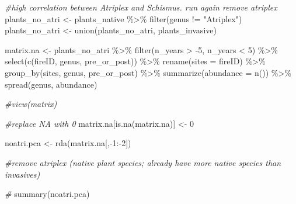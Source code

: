 \documentclass[
]{article}
\newenvironment{Shaded}{\begin{snugshade}}{\end{snugshade}}
\newcommand{\AttributeTok}[1]{\textcolor[rgb]{0.77,0.63,0.00}{#1}}
\newcommand{\CommentTok}[1]{\textcolor[rgb]{0.56,0.35,0.01}{\textit{#1}}}
\newcommand{\DecValTok}[1]{\textcolor[rgb]{0.00,0.00,0.81}{#1}}
\newcommand{\FunctionTok}[1]{\textcolor[rgb]{0.00,0.00,0.00}{#1}}
\newcommand{\NormalTok}[1]{#1}
\newcommand{\OtherTok}[1]{\textcolor[rgb]{0.56,0.35,0.01}{#1}}
\newcommand{\SpecialCharTok}[1]{\textcolor[rgb]{0.00,0.00,0.00}{#1}}
\newcommand{\StringTok}[1]{\textcolor[rgb]{0.31,0.60,0.02}{#1}}
\begin{document}
\begin{Shaded}
\begin{Highlighting}[]
\CommentTok{\#high correlation between Atriplex and Schismus. run again remove atriplex}
\NormalTok{plants\_no\_atri }\OtherTok{\textless{}{-}}\NormalTok{ plants\_native }\SpecialCharTok{\%\textgreater{}\%} 
  \FunctionTok{filter}\NormalTok{(genus }\SpecialCharTok{!=} \StringTok{"Atriplex"}\NormalTok{)}
\NormalTok{plants\_no\_atri }\OtherTok{\textless{}{-}} \FunctionTok{union}\NormalTok{(plants\_no\_atri, plants\_invasive)}

\NormalTok{matrix.na }\OtherTok{\textless{}{-}}\NormalTok{ plants\_no\_atri }\SpecialCharTok{\%\textgreater{}\%}
  \FunctionTok{filter}\NormalTok{(n\_years }\SpecialCharTok{\textgreater{}} \SpecialCharTok{{-}}\DecValTok{5}\NormalTok{, n\_years }\SpecialCharTok{\textless{}} \DecValTok{5}\NormalTok{) }\SpecialCharTok{\%\textgreater{}\%}
  \FunctionTok{select}\NormalTok{(}\FunctionTok{c}\NormalTok{(fireID, genus, pre\_or\_post)) }\SpecialCharTok{\%\textgreater{}\%} 
  \FunctionTok{rename}\NormalTok{(}\AttributeTok{sites =}\NormalTok{ fireID) }\SpecialCharTok{\%\textgreater{}\%}  
  \FunctionTok{group\_by}\NormalTok{(sites, genus, pre\_or\_post) }\SpecialCharTok{\%\textgreater{}\%} 
  \FunctionTok{summarize}\NormalTok{(}\AttributeTok{abundance =} \FunctionTok{n}\NormalTok{()) }\SpecialCharTok{\%\textgreater{}\%} 
  \FunctionTok{spread}\NormalTok{(genus, abundance)}
  
\CommentTok{\#view(matrix)}

\CommentTok{\#replace NA with 0}
\NormalTok{matrix.na[}\FunctionTok{is.na}\NormalTok{(matrix.na)] }\OtherTok{\textless{}{-}} \DecValTok{0}

\NormalTok{noatri.pca }\OtherTok{\textless{}{-}} \FunctionTok{rda}\NormalTok{(matrix.na[,}\SpecialCharTok{{-}}\DecValTok{1}\SpecialCharTok{:{-}}\DecValTok{2}\NormalTok{])}

\CommentTok{\#remove atriplex (native plant species; already have more native species than invasives)}

\CommentTok{\#}
\FunctionTok{summary}\NormalTok{(noatri.pca)}
\end{Highlighting}
\end{Shaded}
\end{document}
